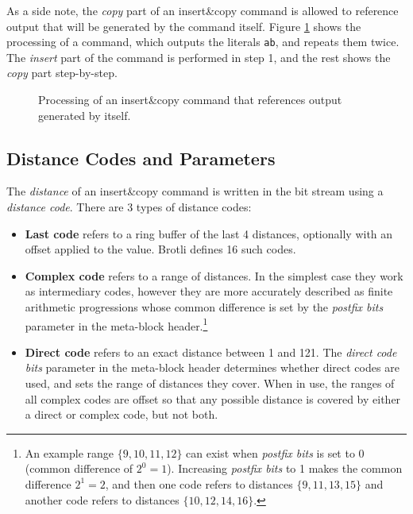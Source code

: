 \documentclass[english,master,dept460,male,cpp,cpdeclaration]{diploma}
\newcommand{\nosep}{\itemsep0em}
\newcommand{\texfigure}[1]{
}
\begin{document}
	As a side note, the \emph{copy} part of an insert\&copy command is allowed to reference output that will be generated by the command itself. Figure \ref{fig:ic-repeat-literals} shows the processing of a command, which outputs the literals \verb|ab|, and repeats them twice. The \emph{insert} part of the command is performed in step 1, and the rest shows the \emph{copy} part step-by-step.
	
	\begin{figure}[H]
		\centering
		\texfigure{self-referential-ic-command-steps}
		\caption{Processing of an insert\&copy command that references output generated by itself.}
		\label{fig:ic-repeat-literals}
	\end{figure}
	
	\subsection{Distance Codes and Parameters}
	
	The \emph{distance} of an insert\&copy command is written in the bit stream using a \emph{distance code}. There are 3 types of distance codes:
	
	\begin{itemize} \nosep
		\item \textbf{Last code} refers to a ring buffer of the last 4 distances, optionally with an offset applied to the value. Brotli defines 16 such codes.
		\item \textbf{Complex code} refers to a range of distances. In the simplest case they work as intermediary codes, however they are more accurately described as finite arithmetic progressions whose common difference is set by the \emph{postfix bits} parameter in the meta-block header.\footnote{An example range $\{ 9, 10, 11, 12 \}$ can exist when \emph{postfix bits} is set to 0 (common difference of $2^0 = 1$). Increasing \emph{postfix bits} to 1 makes the common difference $2^1 = 2$, and then one code refers to distances $\{ 9, 11, 13, 15 \}$ and another code refers to distances $\{ 10, 12, 14, 16 \}$.}
		\item \textbf{Direct code} refers to an exact distance between 1 and 121. The \emph{direct code bits} parameter in the meta-block header determines whether direct codes are used, and sets the range of distances they cover. When in use, the ranges of all complex codes are offset so that any possible distance is covered by either a direct or complex code, but not both.
	\end{itemize}
	
\end{document}

